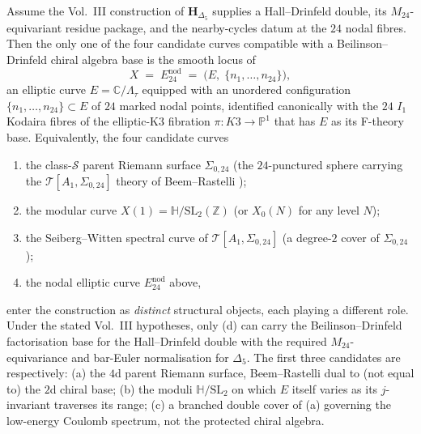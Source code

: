 \begin{theorem}
\label{thm:confspaces-canonical-curve-HDeltaFive}
\ClaimStatusConditional
Assume the Vol.~III construction of $\mathbf{H}_{\Delta_5}$ supplies a
Hall--Drinfeld double, its $M_{24}$-equivariant residue package, and the
nearby-cycles datum at the $24$ nodal fibres. Then the only one of the
four candidate curves compatible with a Beilinson--Drinfeld chiral
algebra base is the smooth locus of
\[
 X \;=\; E^{\mathrm{nod}}_{24}
 \;=\; \bigl(E,\;\{n_1,\ldots,n_{24}\}\bigr),
\]
an elliptic curve $E=\mathbb{C}/\Lambda_\tau$ equipped with an unordered
configuration $\{n_1,\ldots,n_{24}\}\subset E$ of $24$ marked nodal
points, identified canonically with the $24$ $I_1$ Kodaira fibres of
the elliptic-K3 fibration $\pi\colon K3\to\mathbb{P}^1$ that has $E$ as
its F-theory base. Equivalently, the four candidate curves
\begin{enumerate}[label=\textup{(\alph*)}]
\item the class-$\mathcal{S}$ parent Riemann surface $\Sigma_{0,24}$ (the
 $24$-punctured sphere carrying the $\mathcal{T}[A_1,\Sigma_{0,24}]$
 theory of Beem--Rastelli \cite{BeemRastelli2013});
\item the modular curve $X(1)=\mathbb{H}/\mathrm{SL}_2(\mathbb{Z})$ (or
 $X_0(N)$ for any level $N$);
\item the Seiberg--Witten spectral curve of $\mathcal{T}[A_1,\Sigma_{0,24}]$
 (a degree-$2$ cover of $\Sigma_{0,24}$);
\item the nodal elliptic curve $E^{\mathrm{nod}}_{24}$ above,
\end{enumerate}
enter the construction as \emph{distinct} structural objects, each playing
a different role. Under the stated Vol.~III hypotheses, only
\textup{(d)} can carry the Beilinson--Drinfeld factorisation base for
the Hall--Drinfeld double with the required $M_{24}$-equivariance and
bar-Euler normalisation for $\Delta_5$. The first three candidates are
respectively:
\textup{(a)} the $4$d parent Riemann surface, Beem--Rastelli dual to (not
equal to) the $2$d chiral base; \textup{(b)} the moduli $\mathbb{H}/\mathrm{SL}_2$
on which $E$ itself varies as its $j$-invariant traverses its range;
\textup{(c)} a branched double cover of (a) governing the low-energy Coulomb
spectrum, not the protected chiral algebra.
\end{theorem}

